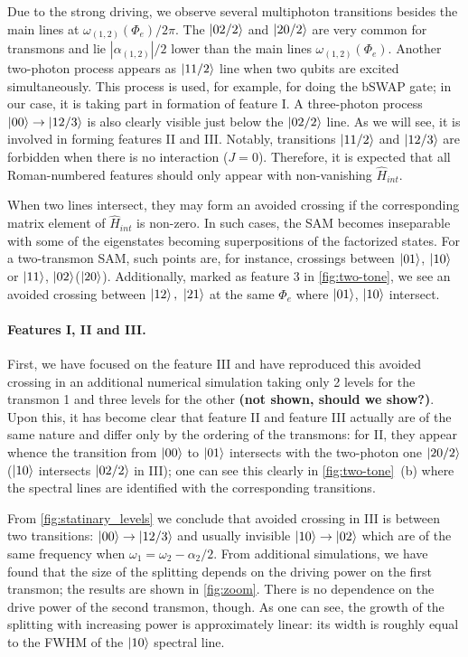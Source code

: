 \documentclass[%
 aip,
 amsmath,amssymb,
 reprint,%
]{revtex4-1}
\begin{document}
Due to the strong driving, we observe several multiphoton transitions besides the main lines at $\omega_{(1,2)}(\Phi_e)/2\pi$. The $\ket{02/2}$ and $\ket{20/2}$ are very common for transmons and lie $|\alpha_{(1,2)}|/2$ lower than the main lines $\omega_{(1,2)}(\Phi_e)$. Another two-photon process appears as $\ket{11/2}$ line when two qubits are excited simultaneously. This process is used, for example, for doing the bSWAP gate\cite{poletto2012entanglement}; in our case, it is taking part in formation of feature I. A three-photon process $\ket{00}\rightarrow\ket{12/3}$ is also clearly visible just below the $\ket{02/2}$ line. As we will see, it is involved in forming features II and III. Notably, transitions $\ket{11/2}$ and $\ket{12/3}$ are forbidden when there is no interaction ($J=0$). Therefore, it is expected that all Roman-numbered features should only appear with non-vanishing $\hat H_{int}$.

When two lines intersect, they may form an avoided crossing if the corresponding matrix element of $\hat H_{int}$ is non-zero. In such cases, the SAM becomes inseparable with some of the eigenstates becoming superpositions of the factorized states. For a two-transmon SAM, such points are, for instance, crossings between $\ket{01}$, $\ket{10}$ or $ \ket{11} $, $ \ket{02} $($ \ket{20} $). Additionally, marked as feature 3 in \autoref{fig:two-tone}, we see an avoided crossing between $\ket{12},\ \ket{21}$ at the same $\Phi_e$ where $\ket{01}$, $\ket{10}$ intersect.


\paragraph{Features I, II and III.} First, we have focused on the feature III and have reproduced this avoided crossing in an additional numerical simulation taking only 2 levels for the transmon 1 and three levels for the other \textbf{(not shown, should we show?)}. Upon this, it has become clear that feature II and feature III actually are of the same nature and differ only by the ordering of the transmons: for II, they appear whence the transition from $\ket{00}$ to $\ket{01}$ intersects with the two-photon one $\ket{20/2}$ ($\ket{10}$ intersects $\ket{02/2}$ in III); one can see this clearly in \autoref{fig:two-tone}~(b) where the spectral lines are identified with the corresponding transitions.

From \autoref{fig:statinary_levels} we conclude that avoided crossing in III is between two transitions: $\ket{00}\rightarrow\ket{12/3}$ and usually invisible $\ket{10}\rightarrow \ket{02}$ which are of the same frequency when $\omega_1 = \omega_2-\alpha_2/2$. From additional simulations, we have found that the size of the splitting depends on the driving power on the first transmon; the results are shown in \autoref{fig:zoom}. There is no dependence on the drive power of the second transmon, though. As one can see, the growth of the splitting with increasing power is approximately linear: its width is roughly equal to the FWHM of the $\ket{10}$ spectral line. 
\end{document}
